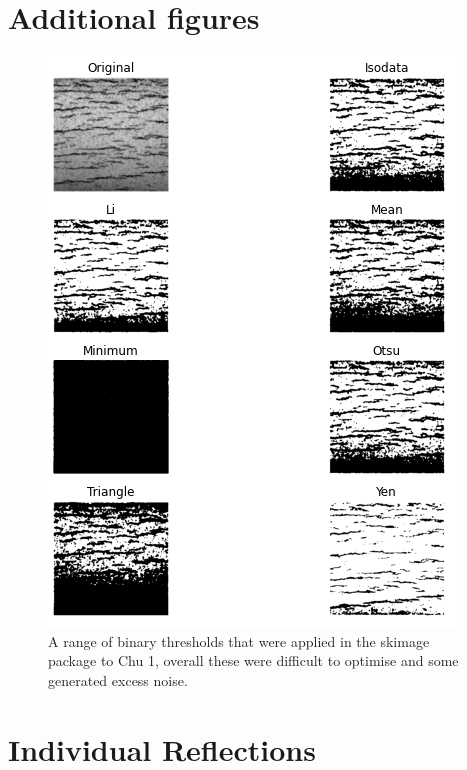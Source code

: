 \documentclass{article}
\begin{document}
\newpage



\newpage
\appendix
\section{Additional figures}

\begin{figure}[h]
	    \centering
	    \includegraphics[scale=0.7]{Figures/skimage_thresholds.png}
	    \caption{A range of binary thresholds that were applied in the skimage package to Chu 1, overall these were difficult to optimise and some generated excess noise.}
	    \label{fig:skimage_threshold}
	\end{figure}
	
\section{Individual Reflections}
\end{document}
